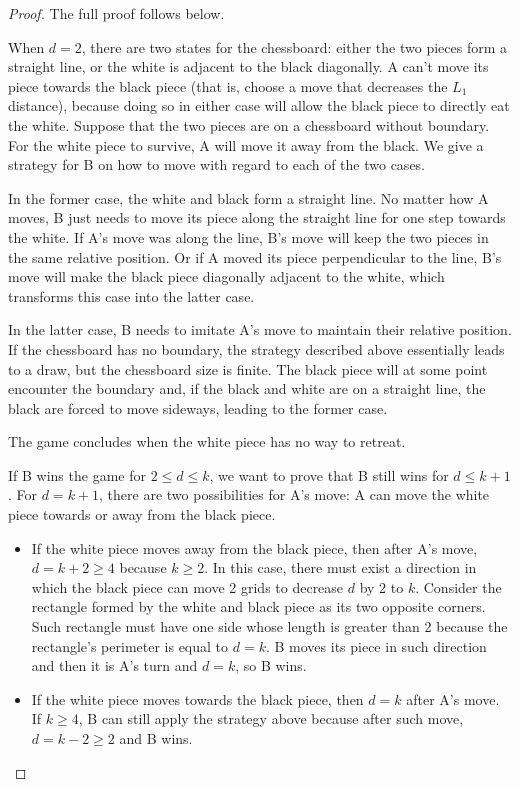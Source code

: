 \documentclass[a4paper]{article}
\begin{document}
\begin{proof}
    The full proof follows below.

    When $d = 2$, there are two states for the chessboard: either the two pieces
    form a straight line, or the white is adjacent to the black diagonally. A
    can't move its piece towards the black piece (that is, choose a move that
    decreases the $L_1$ distance), because doing so in either case will allow
    the black piece to directly eat the white. Suppose that the two pieces are
    on a chessboard without boundary. For the white piece to survive, A will
    move it away from the black. We give a strategy for B on how to move with
    regard to each of the two cases.

    In the former case, the white and black form a straight line. No matter how
    A moves, B just needs to move its piece along the straight line for one step
    towards the white. If A's move was along the line, B's move will keep the
    two pieces in the same relative position. Or if A moved its piece
    perpendicular to the line, B's move will make the black piece diagonally
    adjacent to the white, which transforms this case into the latter case.

    In the latter case, B needs to imitate A's move to maintain their relative
    position. If the chessboard has no boundary, the strategy described above
    essentially leads to a draw, but the chessboard size is finite. The black
    piece will at some point encounter the boundary and, if the black and white
    are on a straight line, the black are forced to move sideways, leading to
    the former case.

    The game concludes when the white piece has no way to retreat.

    If B wins the game for $2 \leq d \leq k$, we want to prove that B still wins
    for $d \leq k + 1$. For $d = k + 1$, there are two possibilities for A's
    move: A can move the white piece towards or away from the black piece.
    \begin{itemize}
        \item If the white piece moves away from the black piece, then after A's
        move, $d = k + 2 \geq 4$ because $k \geq 2$. In this case, there must
        exist a direction in which the black piece can move 2 grids to decrease
        $d$ by 2 to $k$. Consider the rectangle formed by the white and black
        piece as its two opposite corners. Such rectangle must have one side
        whose length is greater than 2 because the rectangle's perimeter is
        equal to $d = k$. B moves its piece in such direction and then it is A's
        turn and $d = k$, so B wins.
        \item If the white piece moves towards the black piece, then $d = k$
        after A's move. If $k \geq 4$, B can still apply the strategy above
        because after such move, $d = k - 2 \geq 2$ and B wins.


\end{itemize}
\end{proof}
\end{document}
